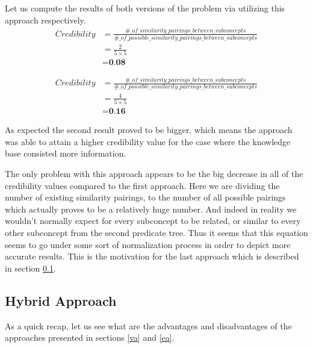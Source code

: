 \documentclass[egilmezThesis.tex]{subfiles}
\begin{document}
Let us compute the results of both versions of the problem via utilizing this approach respectively.
 \begin{equation}
\begin{split}
\textit{Credibility} &= \frac{\#\_of\_similarity\_pairings\_between\_subconcepts}{\#\_of\_possible\_similarity\_pairings\_between\_subconcepts} \\
&= \frac{2}{5 \times 5} \\
&= \textbf{0.08} 
\end{split}
\end{equation}

 \begin{equation}
\begin{split}
\textit{Credibility} &= \frac{\#\_of\_similarity\_pairings\_between\_subconcepts}{\#\_of\_possible\_similarity\_pairings\_between\_subconcepts} \\
&= \frac{4}{5 \times 5} \\
&= \textbf{0.16} 
\end{split}
\end{equation}

As expected the second result proved to be bigger, which means the approach was able to attain a higher credibility value for the case where the knowledge base consisted more information.

The only problem with this approach appears to be the big decrease in all of the credibility values compared to the first approach. Here we are dividing the number of existing similarity pairings, to the number of all possible pairings which actually proves to be a relatively huge number. And indeed in reality we wouldn't normally expect for every subconcept to be related, or similar to every other subconcept from the second predicate tree. Thus it seems that this equation seems to go under some sort of normalization process in order to depict more accurate results. This is the motivation for the last approach which is described in section \ref{ha}.

\subsection{Hybrid Approach}
\label{ha}

As a quick recap, let us see what are the advantages and disadvantages of the approaches presented in sections \ref{va} and \ref{ea}. 
\end{document}
